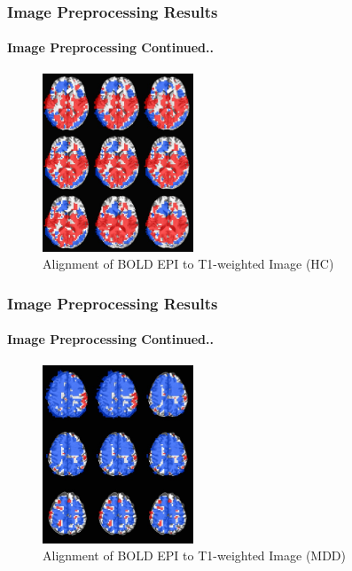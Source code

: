 \documentclass{beamer}
\begin{document}
  \begin{frame}[shrink=6,t]
    \frametitle{Image Preprocessing Results}
    \framesubtitle{Image Preprocessing Continued..}

      \begin{center}
    \begin{figure}[H]
      \includegraphics[width=0.4\textwidth]{./.img/aligment-test.jpg}
      \caption{Alignment of BOLD EPI to T1-weighted Image (HC)}
    \end{figure}
      \end{center}

  \end{frame}

  \begin{frame}[shrink=6,t]
    \frametitle{Image Preprocessing Results}
    \framesubtitle{Image Preprocessing Continued..}

      \begin{center}
    \begin{figure}[H]
      \includegraphics[width=0.4\textwidth]{./.img/0259-MDD.jpg}
      \caption{Alignment of BOLD EPI to T1-weighted Image (MDD)}
    \end{figure}
      \end{center}

  \end{frame}
\end{document}
